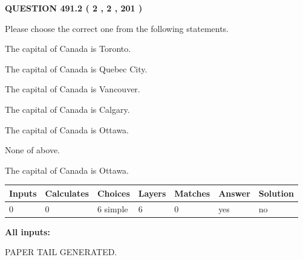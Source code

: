 \documentclass[12pt]{article}
\begin{document}
\vspace{0.2in}
  
{\textbf{\Large{QUESTION
491.2 
 ( 2 , 2 , 201 )
}}}
  
  
Please choose the correct one from the following statements.
 
 
The capital of Canada is Toronto.
 
 
The capital of Canada is Quebec City.
 
 
The capital of Canada is Vancouver.
 
 
The capital of Canada is Calgary.
 
 
The capital of Canada is Ottawa.
 
 
 None of above.
 
 
\noindent{}
 
 
The capital of Canada is Ottawa.
 
 
\noindent{}
 
 
   
   
   
   
\noindent\begin{tabular}{|l|l|l|l|l|l|l|}
 \hline
Inputs & Calculates & Choices & Layers & Matches & Answer & Solution \\ \hline
 0  & 
 0  & 
 6
  simple  
  & 
 6  & 
 0  & 
  yes & 
  no 
  \\ \hline
 \end{tabular}
   
   
   
   
\noindent{}
   
   
   
   
\noindent\vspace{0.1in}\hspace{-0.08in} {\textbf{\Large{All inputs: }}}
   
   
   
   
   
   
 \vspace{0.2in}
 
   
   
\vspace{2.0in} PAPER TAIL GENERATED.
   
\end{document}
